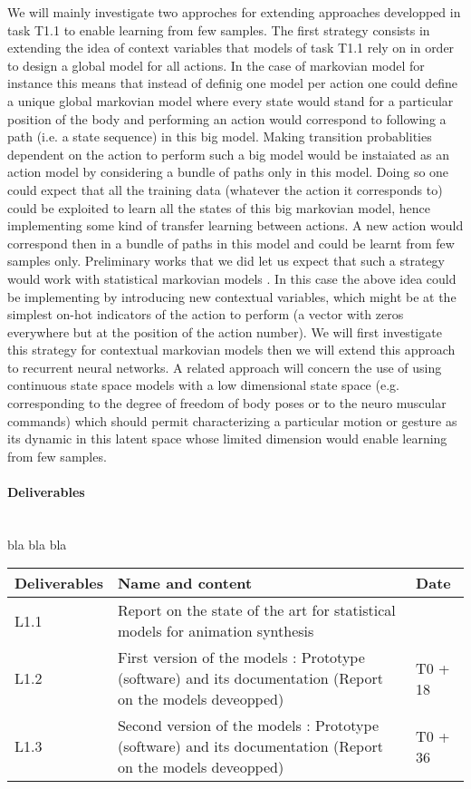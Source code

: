We will mainly investigate two approches for extending approaches developped in task T1.1 to enable learning from few samples. The first strategy consists in extending the idea of context variables that models of task T1.1 rely on in order to design a global model for all actions.
In the case of markovian model for instance this means that instead of definig one model per action one could define a unique global markovian model where every state would stand for a particular position of the body and performing an action would correspond to following a path (i.e. a state sequence) in this big model. 
Making transition probablities dependent on the action to perform such a big model would be instaiated as an action model by considering a bundle of paths only in this model.  Doing so one could expect that all the training data (whatever the action it corresponds to) could be exploited to learn all the states of this big markovian model, hence implementing some kind of transfer learning between actions. 
A new action would correspond then in a bundle of paths in this model and could be learnt from few samples only. Preliminary works that we did let us expect that such a strategy would work with statistical markovian models \cite{DBLP:conf/icassp/DingRAP13, RadenenThesis}. In this case the above idea could be implementing by introducing new contextual variables, which might be at the simplest on-hot indicators of the action to perform (a vector with zeros everywhere but at the position of the action number). We will first investigate this strategy for contextual markovian models then we will extend this approach to recurrent neural networks.
A related approach will concern the use of using continuous state space models with a low dimensional state space (e.g. corresponding to the degree of freedom of body poses or to the neuro muscular commands) which should permit characterizing a particular motion or gesture as its dynamic in this latent space whose limited dimension would enable learning from few samples.

\paragraph{Deliverables}\\

 bla bla bla



\begin{tabular}{|p{3cm}|p{10cm}|p{1.5cm}|}\hline
Deliverables & Name and content  & Date  \\\hline
L1.1  & Report on the state of the art for statistical models for animation synthesis & \\\hline
L1.2  & First version of the models : Prototype (software) and its documentation (Report on the models deveopped) & T0 + 18 \\\hline
L1.3  & Second version of the models : Prototype (software) and its documentation (Report on the models deveopped)  & T0 + 36 \\\hline
\end{tabular}

